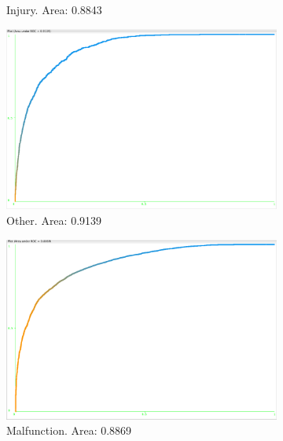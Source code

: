 \documentclass[11pt, notitlepage,abstracton,oneside]{article}   	%
\begin{document}
\begin{figure}[ht]
\begin{subfigure}[b]{0.3\textwidth}
        \caption{Injury. Area: 0.8843}
        \label{fig:injury}
    \end{subfigure}
    \hfill
    \begin{subfigure}[b]{0.3\textwidth}
        \centering
        \includegraphics[width=\textwidth]{figures/other}
        \caption{Other. Area: 0.9139}
        \label{fig:other}
    \end{subfigure}    
    \begin{subfigure}[b]{0.4\textwidth}
        \centering
        \includegraphics[width=\textwidth]{figures/malfunction}
        \caption{Malfunction. Area: 0.8869}
        \label{fig:injury}
    \end{subfigure}  
    \begin{subfigure}[b]{0.4\textwidth}
        \centering

\end{subfigure}
\end{figure}
\end{document}
